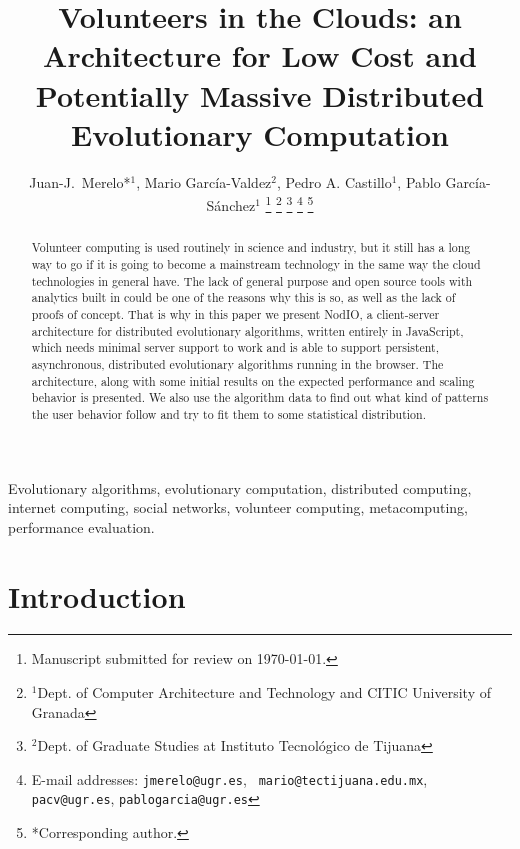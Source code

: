 \documentclass[journal,onecolumn]{IEEEtran}
\begin{document}
\title{Volunteers in the Clouds: an Architecture for Low Cost and
  Potentially Massive Distributed Evolutionary Computation} 

\author{Juan-J.~Merelo*$^1$, Mario Garc\'ia-Valdez$^2$, Pedro A. Castillo$^1$, Pablo Garc\'ia-S\'anchez$^1$
\thanks{Manuscript submitted for review on \today.}%
\thanks{$^1$Dept. of Computer Architecture and Technology and CITIC University of Granada}%
\thanks{$^2$Dept. of Graduate Studies at Instituto Tecnol\'ogico de Tijuana}%
\thanks{E-mail addresses: {\tt jmerelo@ugr.es}, {\tt
    mario@tectijuana.edu.mx}, {\tt pacv@ugr.es}, {\tt pablogarcia@ugr.es}}%
\thanks{*Corresponding author.}%
}

\maketitle

\begin{abstract}
Volunteer computing is used routinely in science and industry, but it
still has a long way to go if it is going to become a mainstream technology in the
same way the cloud technologies in general have. The lack of general
purpose and open source tools 
with analytics built in could be one of the reasons why this is so, as
well as the lack of proofs of concept. That is why in this paper we
present NodIO, a client-server architecture for distributed
evolutionary algorithms, written entirely in JavaScript, which needs
minimal server support to work and is able to support persistent,
asynchronous, distributed evolutionary algorithms running in the
browser. The architecture, along with some initial results on the
expected performance and scaling 
behavior is presented. We also use the algorithm data to 
find out what kind of patterns the user behavior follow and try to fit
them to some statistical distribution. 
\end{abstract}

\begin{IEEEkeywords}
Evolutionary algorithms, evolutionary computation, distributed computing, internet computing,
social networks, volunteer computing, metacomputing, performance evaluation. 
\end{IEEEkeywords}


\section{Introduction}
\end{document}
